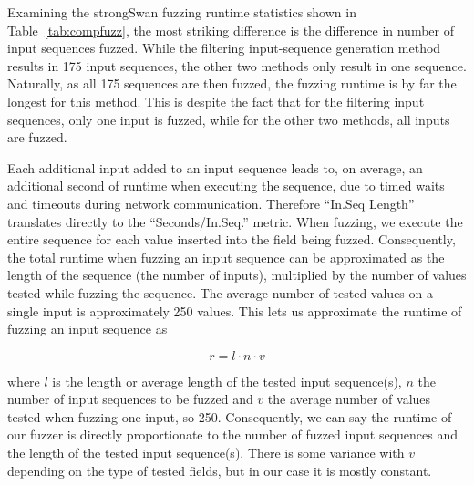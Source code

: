 Examining the strongSwan fuzzing runtime statistics shown in Table~\ref{tab:compfuzz}, the most striking difference is the difference in number of input sequences fuzzed. While the filtering input-sequence generation method results in 175 input sequences, the other two methods only result in one sequence. Naturally, as all 175 sequences are then fuzzed, the fuzzing runtime is by far the longest for this method. This is despite the fact that for the filtering input sequences, only one input is fuzzed, while for the other two methods, all inputs are fuzzed. 

Each additional input added to an input sequence leads to, on average, an additional second of runtime when executing the sequence, due to timed waits and timeouts during network communication. Therefore ``In.Seq Length'' translates directly to the  ``Seconds/In.Seq.'' metric. When fuzzing, we execute the entire sequence for each value inserted into the field being fuzzed. Consequently, the total runtime when fuzzing an input sequence can be approximated as the length of the sequence (the number of inputs), multiplied by the number of values tested while fuzzing the sequence. The average number of tested values on a single input is approximately 250 values. This lets us approximate the runtime of fuzzing an input sequence as

\begin{equation}
	r = l \cdot n \cdot v
\end{equation}

where $l$ is the length or average length of the tested input sequence(s), $n$ the number of input sequences to be fuzzed and $v$ the average number of values tested when fuzzing one input, so 250. Consequently, we can say the runtime of our fuzzer is directly proportionate to the number of fuzzed input sequences and the length of the tested input sequence(s). There is some variance with $v$ depending on the type of tested fields, but in our case it is mostly constant.